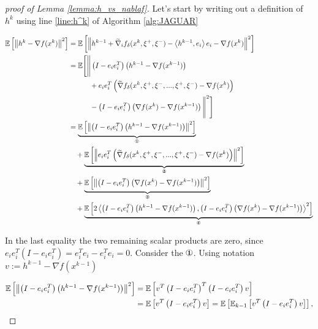     \begin{proof}[proof of Lemma \ref{lemma:h_vs_nablaf}]
        Let's start by writing out a definition of $h^{k}$ using line \ref{line:h^k} of Algorithm \ref{alg:JAGUAR}

        \begin{equation*}
        \begin{split}
            \expect{\norms{h^{k} - \nabla f(x^{k})}^2} 
            &=
            \expect{\norms{h^{k-1} + \widetilde{\nabla}_i f_{\delta}(x^k, \xi^+, \xi^-) - \dotprod{h^{k-1}}{e_i} e_i - \nabla f(x^{k})}^2}
            \\&=
            \mathbb{E}\Bigg[\Bigg\|
            \left(I - e_i e_i^T\right) \left(h^{k-1} - \nabla f(x^{k-1}) \right) 
            \\&\qquad\quad+ e_i e_i^T \left(\widetilde{\nabla} f_{\delta}(x^k, \xi^+, \xi^-, ..., \xi^+, \xi^-) - \nabla f(x^k) \right)
            \\&\qquad\quad- \left(I - e_i e_i^T\right) \left(\nabla f(x^{k}) - \nabla f(x^{k-1})\right)\Bigg\|^2\Bigg]
            \\&=
            \underbrace{\expect{\norms{\left(I - e_i e_i^T\right) \left(h^{k-1} - \nabla f(x^{k-1}) \right) }^2}}_{\circledOne}
            \\&\quad+ \underbrace{\expect{\norms{e_i e_i^T \left(\widetilde{\nabla} f_{\delta}(x^k, \xi^+, \xi^-, ..., \xi^+, \xi^-) - \nabla f(x^k) \right)}^2}}_{\circledTwo}
            \\&\quad+
            \underbrace{\expect{\norms{\left(I - e_i e_i^T\right) \left(\nabla f(x^{k}) - \nabla f(x^{k-1})\right)}^2}}_{\circledThree}
            \\&\quad+
            \underbrace{\expect{2\dotprod{\left(I - e_i e_i^T\right) \left(h^{k-1} - \nabla f(x^{k-1}) \right)}{\left(I - e_i e_i^T\right) \left(\nabla f(x^{k}) - \nabla f(x^{k-1})\right)}^2}}_{\circledFour}
        \end{split}
        \end{equation*}

        In the last equality the two remaining scalar products are zero, since  $e_i e_i^T \left(I - e_i e_i^T\right) = e_i^T e_i - e_i^T e_i = 0$. Consider the $\circledOne$. Using notation $v := h^{k-1} - \nabla f(x^{k-1})$

        \begin{equation*}
        \begin{split}
            \mathbb{E}\left[ \left\| \left(I - e_i e_i^T\right) \left(h^{k-1} - \nabla f(x^{k-1}) \right) \right\|^2 \right]
            &=
            \mathbb{E}\left[ v^T\left(I - e_i e_i^T\right)^T \left(I - e_i e_i^T\right) v \right]
            \\&=
            \mathbb{E}\left[ v^T\left(I - e_i e_i^T\right) v \right]
            = \mathbb{E}\left[ \mathbb{E}_{k-1}\left[ v^T\left(I - e_i e_i^T\right) v \right] \right],
        \end{split}
        \end{equation*}


\end{proof}
